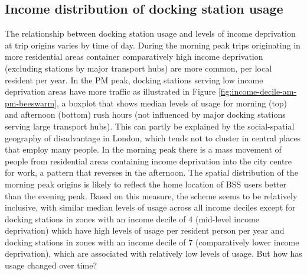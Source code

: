 \documentclass[
]{article}
\begin{document}
\hypertarget{income-distribution-of-docking-station-usage}{%
\subsection{Income distribution of docking station usage}\label{income-distribution-of-docking-station-usage}}

The relationship between docking station usage and levels of income deprivation at trip origins varies by time of day.
During the morning peak trips originating in more residential areas container comparatively high income deprivation (excluding stations by major transport hubs) are more common, per local resident per year.
In the PM peak, docking stations serving low income deprivation areas have more traffic as illustrated in Figure \ref{fig:income-decile-am-pm-beeswarm}, a boxplot that shows median levels of usage for morning (top) and afternoon (bottom) rush hours (not influenced by major docking stations serving large transport hubs).
This can partly be explained by the social-spatial geography of disadvantage in London, which tends not to cluster in central places that employ many people.
In the morning peak there is a mass movement of people from residential areas containing income deprivation into the city centre for work, a pattern that reverses in the afternoon.
The spatial distribution of the morning peak origins is likely to reflect the home location of BSS users better than the evening peak.
Based on this measure, the scheme seems to be relatively inclusive, with similar median levels of usage across all income deciles except for docking stations in zones with an income decile of 4 (mid-level income deprivation) which have high levels of usage per resident person per year and docking stations in zones with an income decile of 7 (comparatively lower income deprivation), which are associated with relatively low levels of usage.
But how has usage changed over time?
\end{document}
